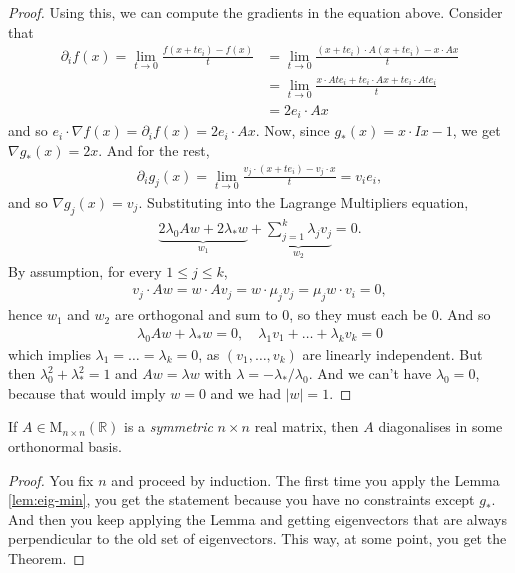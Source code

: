 \begin{proof}
	Using this, we can compute the gradients in the equation above. Consider that
	\begin{align*}
		\partial_{i}f(x) = \lim_{t \to 0} \frac{f(x + te_{i}) - f(x)}{t} & = \lim_{t \to 0} \frac{(x+te_{i}) \cdot A(x+te_{i}) - x \cdot Ax}{t}                    \\
		                                                                 & = \lim_{t \to 0} \frac{x \cdot A te_{i} + t e_{i} \cdot Ax + t e_{i} \cdot A te_{i}}{t} \\
		                                                                 & = 2 e_{i} \cdot Ax
	\end{align*}
	and so $e_{i} \cdot \nabla f(x) = \partial_{i}f(x) = 2e_{i} \cdot Ax$. Now, since $g_{*}(x) = x \cdot Ix-1$, we get $\nabla g_{*}(x) = 2x$.
	And for the rest,
	\begin{align*}
		\partial_{i} g_{j}(x) = \lim_{t \to 0} \frac{v_{j} \cdot (x+te_{i}) - v_{j} \cdot x}{t} = v_{i}e_{i},
	\end{align*}
	and so $\nabla g_{j}(x) = v_{j}$. Substituting into the Lagrange Multipliers equation,
	\begin{align*}
		\underbrace{2 \lambda_{0} Aw + 2\lambda_{*} w}_{w_{1}} + \underbrace{\sum_{j=1}^{k} \lambda_{j} v_{j}}_{w_{2}} = 0.
	\end{align*}
	By assumption, for every $1 \leq j \leq k$, 
	\begin{align*}
		v_{j} \cdot Aw = w \cdot Av_{j} = w \cdot \mu_{j} v_{j} = \mu_{j}w \cdot v_{i} = 0,
	\end{align*}
	hence $w_{1}$ and $w_{2}$ are orthogonal and sum to $0$, so they must each be $0$. And so
	\begin{align*}
		\lambda_{0}Aw +  \lambda_{*}w  = 0, \quad \lambda_{1}v_{1} + \dots + \lambda_{k}v_{k} = 0
	\end{align*}
	which implies $\lambda_{1} = \dots = \lambda_{k} = 0$, as $(v_{1}, \dots, v_{k})$ are linearly independent. But then $\lambda_{0}^{2} + \lambda_{*}^{2} = 1$ and $Aw = \lambda w$ with $\lambda = -\lambda_{*} / \lambda_{0}$. And we can't have $\lambda_{0} = 0$, because that would imply $w = 0$ and we had $\left| w \right| = 1$.
\end{proof}

\begin{theorem}\label{thm:spectral-thm}
	If $A \in \text{M}_{n \times n}(\mathbb{R})$ is a \textit{symmetric} $n \times n$ real matrix, then $A$ diagonalises in some orthonormal basis.
\end{theorem}
\begin{proof}
	You fix $n$ and proceed by induction. The first time you apply the Lemma \ref{lem:eig-min}, you get the statement because you have no constraints except $g_{*}$. And then you keep applying the Lemma and getting eigenvectors that are always perpendicular to the old set of eigenvectors. This way, at some point, you get the Theorem.
\end{proof}

